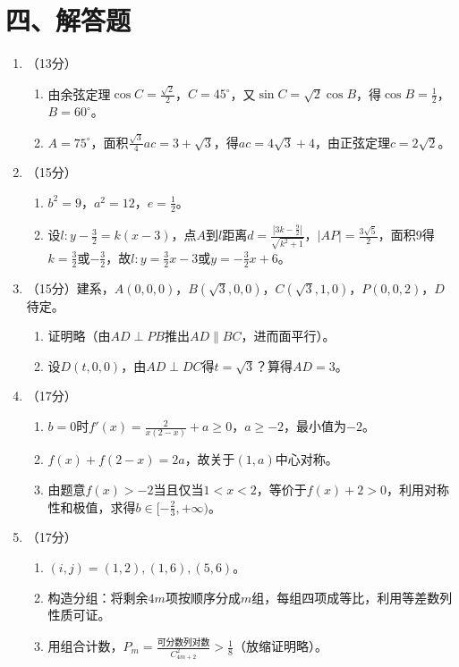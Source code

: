 \documentclass[12pt,a4paper]{article}
\begin{document}
\section*{四、解答题}
\begin{enumerate}[label=\arabic*.]
\item （13分）
\begin{enumerate}[label=(\arabic*)]
\item 由余弦定理$\cos C=\frac{\sqrt2}{2}$，$C=45^\circ$，又$\sin C=\sqrt2\cos B$，得$\cos B=\frac12$，$B=60^\circ$。
\item $A=75^\circ$，面积$\frac{\sqrt3}{4}ac=3+\sqrt3$，得$ac=4\sqrt3+4$，由正弦定理$c=2\sqrt2$。
\end{enumerate}

\item （15分）
\begin{enumerate}[label=(\arabic*)]
\item $b^2=9$，$a^2=12$，$e=\frac12$。
\item 设$l:y-\frac32=k(x-3)$，点$A$到$l$距离$d=\frac{|3k-\frac92|}{\sqrt{k^2+1}}$，$|AP|=\frac{3\sqrt5}{2}$，面积$9$得$k=\frac32$或$-\frac32$，故$l:y=\frac32x-3$或$y=-\frac32x+6$。
\end{enumerate}

\item （15分）建系，$A(0,0,0)$，$B(\sqrt3,0,0)$，$C(\sqrt3,1,0)$，$P(0,0,2)$，$D$待定。
\begin{enumerate}[label=(\arabic*)]
\item 证明略（由$AD\perp PB$推出$AD\parallel BC$，进而面平行）。
\item 设$D(t,0,0)$，由$AD\perp DC$得$t=\sqrt3$？算得$AD=3$。
\end{enumerate}

\item （17分）
\begin{enumerate}[label=(\arabic*)]
\item $b=0$时$f'(x)=\frac{2}{x(2-x)}+a\ge0$，$a\ge -2$，最小值为$-2$。
\item $f(x)+f(2-x)=2a$，故关于$(1,a)$中心对称。
\item 由题意$f(x)>-2$当且仅当$1<x<2$，等价于$f(x)+2>0$，利用对称性和极值，求得$b\in[-\frac23,+\infty)$。
\end{enumerate}

\item （17分）
\begin{enumerate}[label=(\arabic*)]
\item $(i,j)=(1,2),(1,6),(5,6)$。
\item 构造分组：将剩余$4m$项按顺序分成$m$组，每组四项成等比，利用等差数列性质可证。
\item 用组合计数，$P_m=\frac{\text{可分数列对数}}{C_{4m+2}^2}>\frac18$（放缩证明略）。
\end{enumerate}


\end{enumerate}
\end{document}
